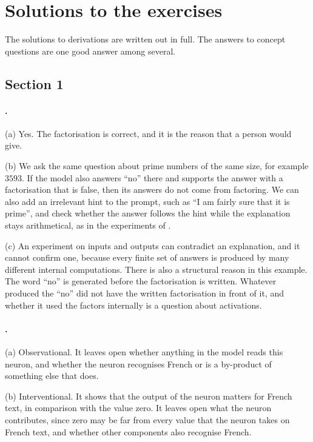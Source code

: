 \section{Solutions to the exercises}
\label{app:solutions}

{\small
The solutions to derivations are written out in full. The answers to concept questions are one good answer among
several.

\subsection*{Section 1}

\paragraph{.}
(a) Yes. The factorisation is correct, and it is the reason that a person would give.

(b) We ask the same question about prime numbers of the same size, for example $3593$. If the model also answers
``no'' there and supports the answer with a factorisation that is false, then its answers do not come from
factoring. We can also add an irrelevant hint to the prompt, such as ``I am fairly sure that it is prime'', and
check whether the answer follows the hint while the explanation stays arithmetical, as in the experiments of
\citet{turpin2023language}.

(c) An experiment on inputs and outputs can contradict an explanation, and it cannot confirm one, because every
finite set of answers is produced by many different internal computations. There is also a structural reason in
this example. The word ``no'' is generated before the factorisation is written. Whatever produced the ``no'' did
not have the written factorisation in front of it, and whether it used the factors internally is a question about
activations.

\paragraph{.}
(a) Observational. It leaves open whether anything in the model reads this neuron, and whether the neuron
recognises French or is a by-product of something else that does.

(b) Interventional. It shows that the output of the neuron matters for French text, in comparison with the value
zero. It leaves open what the neuron contributes, since zero may be far from every value that the neuron takes on
French text, and whether other components also recognise French.

}
